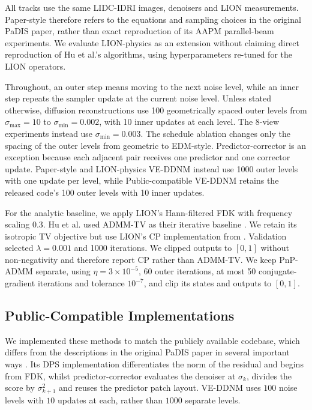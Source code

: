 All tracks use the same LIDC-IDRI images, denoisers and LION measurements. Paper-style therefore refers to the equations and sampling choices in the original PaDIS paper, rather than exact reproduction of its AAPM parallel-beam experiments. We evaluate LION-physics as an extension without claiming direct reproduction of Hu et al.'s algorithms, using hyperparameters re-tuned for the LION operators.

Throughout, an outer step means moving to the next noise level, while an inner step repeats the sampler update at the current noise level. Unless stated otherwise, diffusion reconstructions use 100 geometrically spaced outer levels from \(\sigma_{\max}=10\) to \(\sigma_{\min}=0.002\), with 10 inner updates at each level. The 8-view experiments instead use \(\sigma_{\min}=0.003\). The schedule ablation changes only the spacing of the outer levels from geometric to EDM-style. Predictor-corrector is an exception because each adjacent pair receives one predictor and one corrector update. Paper-style and LION-physics VE-DDNM instead use 1000 outer levels with one update per level, while Public-compatible VE-DDNM retains the released code's 100 outer levels with 10 inner updates.

For the analytic baseline, we apply LION's Hann-filtered FDK with frequency scaling 0.3. Hu et al. used ADMM-TV as their iterative baseline \cite{}. We retain its isotropic TV objective but use LION's CP implementation from  \cite{}. Validation selected \(\lambda=0.001\) and 1000 iterations. We clipped outputs to \([0,1]\) without non-negativity and therefore report CP rather than ADMM-TV. We keep PnP-ADMM separate, using \(\eta=3\times10^{-5}\), 60 outer iterations, at most 50 conjugate-gradient iterations and tolerance \(10^{-7}\), and clip its states and outputs to \([0,1]\).

\subsection{Public-Compatible Implementations}
\label{subsec:public-compatible-implementation}
We implemented these methods to match the publicly available codebase, which differs from the descriptions in the original PaDIS paper in several important ways \cite{}. Its DPS implementation differentiates the norm of the residual and begins from FDK, whilst predictor-corrector evaluates the denoiser at $\sigma_k$, divides the score by $\sigma_{k+1}^2$ and reuses the predictor patch layout. VE-DDNM uses $100$ noise levels with $10$ updates at each, rather than $1000$ separate levels.

